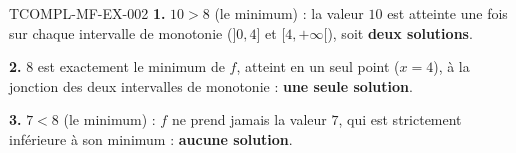 \begin{corrige}{TCOMPL-MF-EX-002}
\textbf{1.} $10 > 8$ (le minimum) : la valeur $10$ est atteinte une fois sur chaque intervalle de monotonie ($]0,4]$ et $[4,+\infty[$), soit \textbf{deux solutions}.

\textbf{2.} $8$ est exactement le minimum de $f$, atteint en un seul point ($x=4$), à la jonction des deux intervalles de monotonie : \textbf{une seule solution}.

\textbf{3.} $7 < 8$ (le minimum) : $f$ ne prend jamais la valeur $7$, qui est strictement inférieure à son minimum : \textbf{aucune solution}.
\end{corrige}
